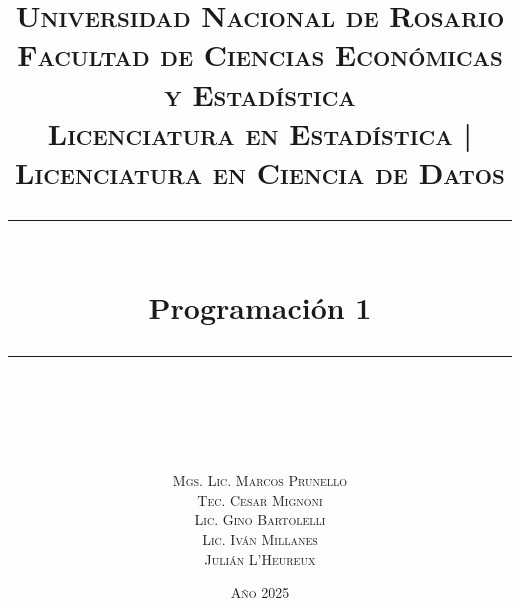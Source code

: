\newcommand{\horrule}[1]{\rule{\linewidth}{#1}}
\title{
	\normalfont \normalsize
	\textsc{
		Universidad Nacional de Rosario \\
		Facultad de Ciencias Económicas y Estadística \\
		Licenciatura en Estadística | Licenciatura en Ciencia de Datos
	} \\ [80pt]
	\Large \horrule{2pt} \\[0.4cm]
	\Huge \textbf{Programación 1} \\
	\horrule{2pt} \\[0.5cm]
}

\author{
	\normalfont \normalsize
	\\[3cm]
	\textsc{Mgs. Lic. Marcos Prunello} \\
  \textsc{Tec. Cesar Mignoni} \\
  \textsc{Lic. Gino Bartolelli} \\
  \textsc{Lic. Iván Millanes} \\
  \textsc{Julián L'Heureux} \\[1cm]
}

\date{
  \textsc{Año 2025}
}
